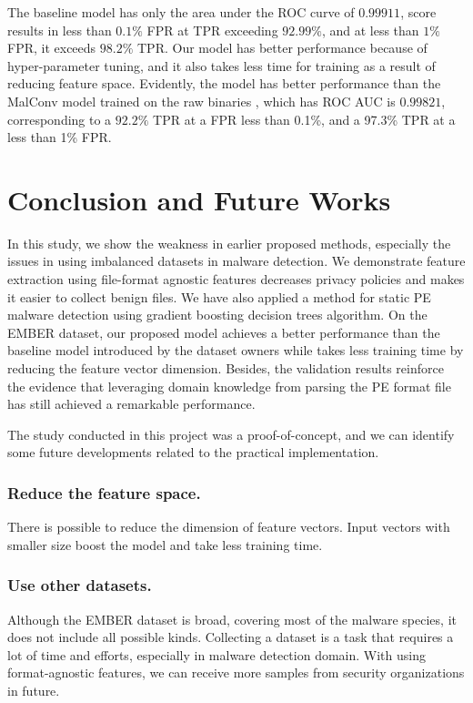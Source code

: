 \documentclass[runningheads]{llncs}
\begin{document}
The baseline model has only the area under the ROC curve of $0.99911$, score results in less than $0.1\%$ FPR at TPR exceeding $92.99\%$, and at less than $1\%$ FPR, it exceeds $98.2\%$ TPR. Our model has better performance because of hyper-parameter tuning, and it also takes less time for training as a result of reducing feature space. Evidently, the model has better performance than the MalConv model trained on the raw binaries \cite{anderson2018ember}, which has ROC AUC is $0.99821$, corresponding to a $92.2\%$ TPR at a FPR less than 0.1\%, and a 97.3\% TPR at a less than 1\% FPR.

\section{Conclusion and Future Works}

In this study, we show the weakness in earlier proposed methods, especially the issues in using imbalanced datasets in malware detection. 
We demonstrate feature extraction using file-format agnostic features decreases privacy policies and makes it easier to collect benign files. 
We have also applied a method for static PE malware detection using gradient boosting decision trees algorithm. 
On the EMBER dataset, our proposed model achieves a better performance than the baseline model introduced by the dataset owners while takes less training time by reducing the feature vector dimension. 
Besides, the validation results reinforce the evidence that leveraging domain knowledge from parsing the PE format file has still achieved a remarkable performance.

The study conducted in this project was a proof-of-concept, and we can identify some future developments related to the practical implementation.

\subsubsection{Reduce the feature space.}

There is possible to reduce the dimension of feature vectors. Input vectors with smaller size boost the model and take less training time. 

\subsubsection{Use other datasets.}

Although the EMBER dataset is broad, covering most of the malware species, it does not include all possible kinds. Collecting a dataset is a task that requires a lot of time and efforts, especially in malware detection domain. With using format-agnostic features, we can receive more samples from security organizations in future. 



\end{document}
